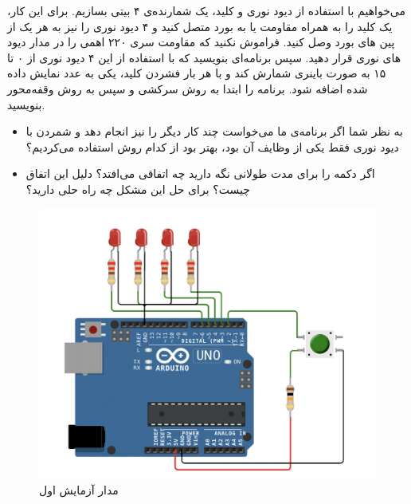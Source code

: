 می‌خواهیم با استفاده از دیود نوری و کلید، یک شمارنده‌ی ۴ بیتی بسازیم. برای این کار، یک کلید را به همراه مقاومت  یا  به بورد متصل کنید و ۴ دیود نوری را نیز به هر یک از پین های بورد وصل کنید. فراموش نکنید که مقاومت سری ۲۲۰ اهمی را در مدار دیود های نوری قرار دهید.
سپس برنامه‌ای بنویسید که با استفاده از این ۴ دیود نوری از ۰ تا ۱۵ به صورت باینری شمارش کند و با هر بار فشردن کلید، یکی به عدد نمایش داده شده اضافه شود. برنامه را ابتدا به روش سرکشی و سپس به روش وقفه‌محور بنویسید.
\begin{itemize}
    \item به نظر شما اگر برنامه‌ی ما می‌خواست چند کار دیگر را نیز انجام دهد و شمردن با دیود نوری فقط یکی از وظایف آن بود، بهتر بود از کدام روش استفاده می‌کردیم؟
    \item اگر دکمه را برای مدت طولانی نگه دارید چه اتفاقی می‌افتد؟ دلیل این اتفاق چیست؟ برای حل این مشکل چه راه حلی دارید؟
\end{itemize}

\begin{figure}[h]
    \centering
    \includegraphics[width=16cm]{L1-Circuit.png}
    \caption{مدار آزمایش اول}
    \label{fig:l1circ}
\end{figure}

\pagebreak


